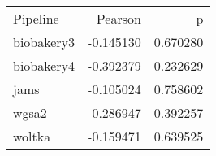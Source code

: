\begin{tabular}{lrr}
Pipeline & Pearson & p \\
biobakery3 & -0.145130 & 0.670280 \\
biobakery4 & -0.392379 & 0.232629 \\
jams & -0.105024 & 0.758602 \\
wgsa2 & 0.286947 & 0.392257 \\
woltka & -0.159471 & 0.639525 \\
\end{tabular}
